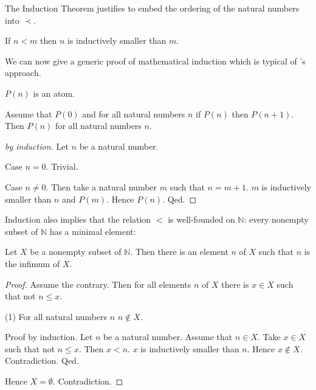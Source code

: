 \documentclass{article}
\begin{document}
%
The Induction Theorem justifies to embed the ordering of the natural numbers
into $\prec$.
%
\begin{forthel}
\begin{axiom}
If $n < m$ then $n$ is inductively smaller than $m$.
\end{axiom}
\end{forthel}
We can now give a generic proof of mathematical induction which
is typical of \Naproche's approach.
\begin{forthel}
\begin{signature}
$P(n)$ is an atom.
\end{signature}

\begin{theorem}
Assume that $P(0)$ and for all natural numbers
$n$ if $P(n)$ then  $P(n+1)$.
Then $P(n)$ for all natural numbers $n$.
\end{theorem}
\begin{proof}[by induction]
Let $n$ be a natural number.

Case $n = 0$. Trivial.

Case $n \neq 0$. Then take a natural number $m$ such that
$n = m + 1$. $m$ is inductively smaller than $n$ and $P(m)$.
Hence $P(n)$.
Qed.
\end{proof}
\end{forthel}

Induction also implies that the relation $<$ is
well-founded on $\mathbb{N}$: every nonempty subset
of $\mathbb{N}$ has a minimal element:

\begin{forthel}

\begin{theorem}
Let $X$ be a nonempty subset of $\mathbb{N}$.
Then there is an element $n$ of $X$ such that
$n$ is the infimum of $X$.
\end{theorem}
\begin{proof}
Assume the contrary. Then
for all elements $n$ of $X$ there
is $x \in X$ such that not $n \leq x$.

(1) For all natural numbers $n$ $n \notin X$.

Proof by induction.
Let $n$ be a natural number.
Assume that $n \in X$.
Take $x \in X$ such that not $n \leq x$.
Then $x < n$. $x$ is inductively smaller than $n$.
Hence $x \notin X$. Contradiction.
Qed.

Hence $X = \emptyset$. Contradiction.

\end{proof}
\end{forthel}
\end{document}
